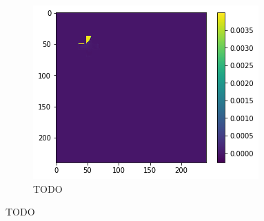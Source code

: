 \begin{figure}[H]
\begin{subfigure}[t]{.33\textwidth}
        \centering
        \includegraphics[width=\linewidth]{chapters/06_hdm/images_analyze/3c_diff.png}
        \caption{TODO}
    \end{subfigure}
    \caption{TODO}
\end{figure}